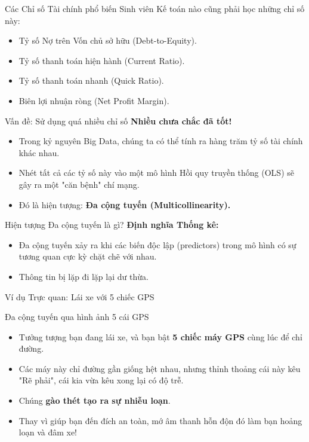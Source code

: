 \documentclass[aspectratio=169]{beamer}
\begin{document}
\begin{frame}{Các Chỉ số Tài chính phổ biến}
    Sinh viên Kế toán nào cũng phải học những chỉ số này:
    \begin{itemize}
        \item Tỷ số Nợ trên Vốn chủ sở hữu (Debt-to-Equity).
        \item Tỷ số thanh toán hiện hành (Current Ratio).
        \item Tỷ số thanh toán nhanh (Quick Ratio).
        \item Biên lợi nhuận ròng (Net Profit Margin).
    \end{itemize}
\end{frame}

\begin{frame}{Vấn đề: Sử dụng quá nhiều chỉ số}
    \textbf{Nhiều chưa chắc đã tốt!}
    \begin{itemize}
        \item Trong kỷ nguyên Big Data, chúng ta có thể tính ra hàng trăm tỷ số tài chính khác nhau.
        \item Nhét tất cả các tỷ số này vào một mô hình Hồi quy truyền thống (OLS) sẽ gây ra một "căn bệnh" chí mạng.
        \item Đó là hiện tượng: \textbf{Đa cộng tuyến (Multicollinearity).}
    \end{itemize}
\end{frame}

\begin{frame}{Hiện tượng Đa cộng tuyến là gì?}
    \textbf{Định nghĩa Thống kê:}
    \begin{itemize}
        \item Đa cộng tuyến xảy ra khi các biến độc lập (predictors) trong mô hình có sự tương quan cực kỳ chặt chẽ với nhau.
        \item Thông tin bị lặp đi lặp lại dư thừa.
    \end{itemize}
\end{frame}

\begin{frame}{Ví dụ Trực quan: Lái xe với 5 chiếc GPS}
    \begin{exampleblock}{Đa cộng tuyến qua hình ảnh 5 cái GPS}
        \begin{itemize}
            \item Tưởng tượng bạn đang lái xe, và bạn bật \textbf{5 chiếc máy GPS} cùng lúc để chỉ đường.
            \item Các máy này chỉ đường gần giống hệt nhau, nhưng thỉnh thoảng cái này kêu "Rẽ phải", cái kia vừa kêu xong lại có độ trễ.
            \item Chúng \textbf{gào thét tạo ra sự nhiễu loạn}. 
            \item Thay vì giúp bạn đến đích an toàn, mớ âm thanh hỗn độn đó làm bạn hoảng loạn và đâm xe!
        \end{itemize}
    \end{exampleblock}
\end{frame}
\end{document}

